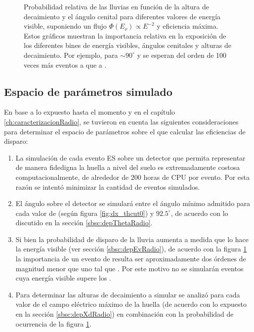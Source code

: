 \begin{figure}[ht!]
		\caption{\label{fig:radioShWeights}
		Probabilidad relativa  de las lluvias en funci\'on de la altura de decaimiento y el \'angulo cenital para diferentes valores de energ\'ia visible, suponiendo un flujo $\Phi(E_\nu)\propto E^{-2}$ y eficiencia m\'axima.
		Estos gr\'aficos muestran la importancia relativa en la exposici\'on de los diferentes bines de energ\'ia visibles, \'angulos cenitales y alturas de decaimiento.
		Por ejemplo, para $\sim90^\circ$ y  se esperan del orden de 100 veces m\'as eventos a  que a .
		}
	\end{figure}
	
	\subsection{Espacio de par\'ametros simulado}
	
	En base a lo expuesto hasta el momento y en el cap\'itulo \ref{ch:caracterizacionRadio}, se tuvieron en cuenta las siguientes consideraciones para determinar el espacio de par\'ametros sobre el que calcular las eficiencias de disparo:
	\begin{enumerate}
		\item La simulaci\'on de cada evento ES sobre un detector que permita representar de manera fidedigna la huella a nivel del suelo es extremadamente costosa computacionalmente, de alrededor de 200 horas de CPU por evento.
		Por esta raz\'on se intent\'o minimizar la cantidad de eventos simulados.
		\item El \'angulo sobre el detector se simular\'a entre el \'angulo m\'inimo admitido para cada valor de \xd{} (seg\'un figura \ref{fig:dx_thcut0}) y $92.5^\circ$, de acuerdo con lo discutido en la secci\'on \ref{sbsc:depThetaRadio}.
		\item Si bien la probabilidad de disparo de la lluvia aumenta a medida que lo hace la energ\'ia visible (ver secci\'on \ref{sbsc:depEvRadio}), de acuerdo con la figura \ref{fig:radioShWeights} la importancia de un evento de  resulta ser aproximadamente dos \'ordenes de magnitud menor que uno tal que . Por este motivo no se simular\'an eventos cuya energ\'ia visible supere los . 
		\item Para determinar las alturas de decaimiento a simular se analiz\'o para cada valor de \ev{} el campo el\'ectrico m\'aximo de la huella (de acuerdo con lo expuesto en la secci\'on \ref{sbsc:depXdRadio}) en combinaci\'on con la probabilidad de ocurrencia de la figura \ref{fig:radioShWeights}.
	\end{enumerate}
	
